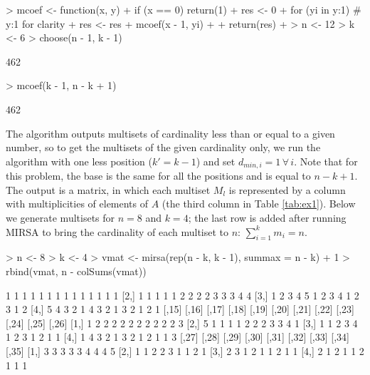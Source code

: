 \documentclass[12pt]{article}
\begin{document}
\begin{Schunk}
\begin{Sinput}
> mcoef <- function(x, y) {
+   if (x == 0) return(1)
+   res <- 0
+   for (yi in y:1) {                     # y:1 for clarity
+     res <- res + mcoef(x - 1, yi)
+   }
+   return(res)
+ }
> n <- 12
> k <- 6
> choose(n - 1, k - 1)
\end{Sinput}
\begin{Soutput}
[1] 462
\end{Soutput}
\begin{Sinput}
> mcoef(k - 1, n - k + 1)
\end{Sinput}
\begin{Soutput}
[1] 462
\end{Soutput}
\end{Schunk}

The algorithm outputs multisets of cardinality less than or equal to a given number, so to get the multisets of the given cardinality only, we run the algorithm with one less position ($k' = k - 1$) and set $d_{min, i} = 1 \, \forall \, i$. Note that for this problem, the base is the same for all the positions and is equal to $n - k + 1$. The output is a matrix, in which each multiset $M_l$ is represented by a column with multiplicities of elements of $A$ (the third column in Table \ref{tab:ex1}). Below we generate multisets for $n = 8$ and $k = 4$; the last row is added after running MIRSA to bring the cardinality of each multiset to $n$: $\sum_{i = 1}^k m_i = n$.

\begin{Schunk}
\begin{Sinput}
> n <- 8
> k <- 4
> vmat <- mirsa(rep(n - k, k - 1), summax = n - k) + 1
> rbind(vmat, n - colSums(vmat))
\end{Sinput}
\begin{Soutput}
     [,1] [,2] [,3] [,4] [,5] [,6] [,7] [,8] [,9] [,10] [,11] [,12] [,13] [,14]
[1,]    1    1    1    1    1    1    1    1    1     1     1     1     1     1
[2,]    1    1    1    1    1    2    2    2    2     3     3     3     4     4
[3,]    1    2    3    4    5    1    2    3    4     1     2     3     1     2
[4,]    5    4    3    2    1    4    3    2    1     3     2     1     2     1
     [,15] [,16] [,17] [,18] [,19] [,20] [,21] [,22] [,23] [,24] [,25] [,26]
[1,]     1     2     2     2     2     2     2     2     2     2     2     3
[2,]     5     1     1     1     1     2     2     2     3     3     4     1
[3,]     1     1     2     3     4     1     2     3     1     2     1     1
[4,]     1     4     3     2     1     3     2     1     2     1     1     3
     [,27] [,28] [,29] [,30] [,31] [,32] [,33] [,34] [,35]
[1,]     3     3     3     3     3     4     4     4     5
[2,]     1     1     2     2     3     1     1     2     1
[3,]     2     3     1     2     1     1     2     1     1
[4,]     2     1     2     1     1     2     1     1     1
\end{Soutput}
\end{Schunk}
\end{document}
